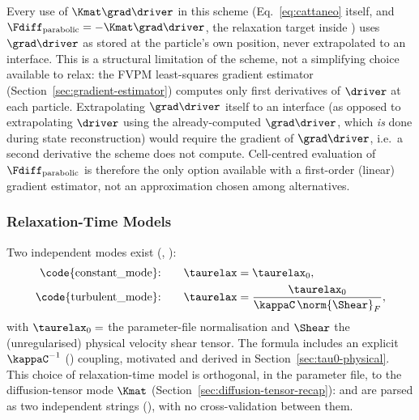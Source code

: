 \begin{remark}
\label{rem:cell-centred-gradients-only}
Every use of $\Kmat\grad\driver$ in this scheme (Eq.~\eqref{eq:cattaneo}
itself, and $\Fdiff_{\rm parabolic}=-\Kmat\grad\driver$, the relaxation
target inside ) uses
$\grad\driver$ as stored at the particle's own position, never
extrapolated to an interface. This is a structural limitation of the
scheme, not a simplifying choice available to relax: the FVPM
least-squares gradient estimator (Section~\ref{sec:gradient-estimator})
computes
only first derivatives of $\driver$ at each particle. Extrapolating
$\grad\driver$ itself to an interface (as opposed to extrapolating
$\driver$ using the already-computed $\grad\driver$, which \emph{is} done
during state reconstruction) would require the gradient of
$\grad\driver$, i.e.\ a second derivative the scheme does not compute.
Cell-centred evaluation of $\Fdiff_{\rm parabolic}$ is therefore the only
option available with a first-order (linear) gradient estimator, not an
approximation chosen among alternatives.
\end{remark}

\subsubsection{Relaxation-Time Models}
\label{sec:tau-modes}
Two independent modes exist
(, ):
\begin{align}
  \text{\code{constant\_mode}:} \qquad & \taurelax = \taurelax_0 , \\
  \text{\code{turbulent\_mode}:} \qquad & \taurelax = \frac{\taurelax_0}{\kappaC\,\norm{\Shear}_F} ,
  \label{eq:tau_turbulent}
\end{align}
with $\taurelax_0=$ the parameter-file normalisation
and $\Shear$ the (unregularised) physical velocity shear tensor. The
 formula includes an explicit $\kappaC^{-1}$
() coupling, motivated and derived
in Section~\ref{sec:tau0-physical}. This choice of relaxation-time model is
orthogonal, in the parameter file, to the diffusion-tensor mode $\Kmat$
(Section~\ref{sec:diffusion-tensor-recap}):  and
 are parsed as two independent strings
(), with no cross-validation between them.

